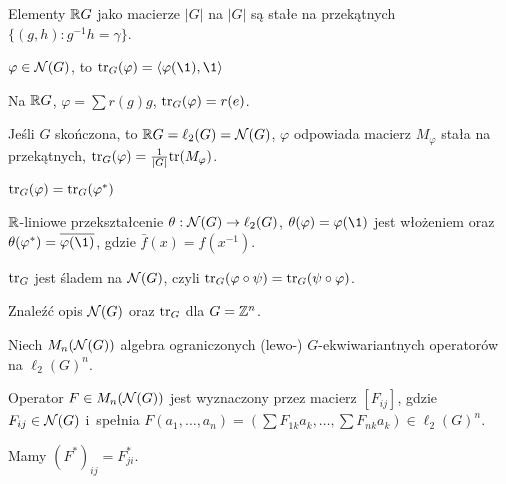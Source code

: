 \begin{uwaga}
	Elementy ${\mathbb{R}} G$ jako macierze $|G|$ na $|G|$ są stałe na przekątnych
	$\{ (g,h): g^{-1} h = \gamma \}$.
\end{uwaga}

\begin{definicja}[ślad]
	$\varphi \in {\mathcal{N}}(G)$, to $\tr_G( \varphi) 
	= \langle \varphi(\1), \1 \rangle$
\end{definicja}

\begin{uwaga}
	Na ${\mathbb{R}} G$, $\varphi = \sum r(g) g$, ${\mathrm{tr}}_G(\varphi) = r(e)$.
\end{uwaga}

\begin{uwaga}
	Jeśli $G$ skończona, to ${\mathbb{R}} G = \ell_2(G) = {\mathcal{N}}(G)$,
	$\varphi$ odpowiada macierz $M_\varphi$ stała na przekątnych,
	${\mathrm{tr}}_G(\varphi) = \frac 1 {|G|} {\mathrm{tr}}(M_\varphi)$.
\end{uwaga}

\begin{stwierdzenie}
	${\mathrm{tr}}_G(\varphi) = {\mathrm{tr}}_G(\varphi^\ast)$
\end{stwierdzenie}

\begin{lemat}
	${\mathbb{R}}$-liniowe przekształcenie ${\theta: {\mathcal{N}}(G) \to \ell_2(G)}$,
	${\theta(\varphi) = \varphi(\1)}$ jest włożeniem
	oraz $\theta(\varphi^\ast) = \overline{\varphi(\1)}$,
	gdzie $\bar{f}(x) = f(x^{-1})$.
\end{lemat}

\begin{wniosek}
	${\mathrm{tr}}_G$ jest śladem na ${\mathcal{N}}(G)$, 
	czyli ${\mathrm{tr}}_G(\varphi \circ \psi) = {\mathrm{tr}}_G(\psi \circ \varphi)$.
\end{wniosek}

\begin{cwiczenie}
	Znaleźć opis ${\mathcal{N}}(G)$ oraz ${\mathrm{tr}}_G$ dla $G= {\mathbb{Z}}^n$.
\end{cwiczenie}

\begin{definicja}
	Niech $M_n({\mathcal{N}}(G))$ algebra ograniczonych (lewo-) 
	$G$-ekwiwariantnych operatorów na $\ell_2(G)^n$.
	
	Operator $F \in M_n({\mathcal{N}}(G))$ jest wyznaczony przez macierz
	$[F_{ij}]$, gdzie $F_{ij} \in {\mathcal{N}}(G)$ i~spełnia
	$F(a_1, \ldots, a_n) = (\sum F_{1k} a_k, \ldots, \sum F_{nk} a_k)
	\in \ell_2(G)^n$.
\end{definicja}

\begin{uwaga}
	Mamy $(F^\ast)_{ij} = F_{ji}^\ast$.
\end{uwaga}

